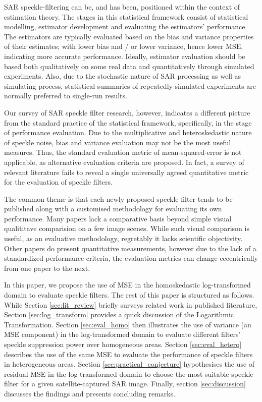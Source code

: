 \documentclass[journal]{IEEEtran}
\begin{document}
SAR speckle-filtering can be, and has been, positioned within the context of estimation theory\cite{Touzi_2002_TGRS}. 
The stages in this statistical framework consist of statistical modelling, estimator development and evaluating the estimators' performance. 
The estimators are typically evaluated based on the bias and variance properties of their estimates; 
	with lower bias and / or lower variance, hence lower MSE, indicating more accurate performance.
Ideally, estimator evaluation should be based both qualitatively on some real data and quantitatively through simulated experiments. 
Also, due to the stochastic nature of SAR processing as well as simulating process, 
	statistical summaries of repeatedly simulated experiments are normally preferred to single-run results.

Our survey of SAR speckle filter research, however, indicates 
	a different picture from the standard practice of the statistical framework, 
	specifically, in the stage of performance evaluation. 
Due to the multiplicative and heteroskedastic nature of speckle noise, 
	bias and variance evaluation may not be the most useful measures. 
Thus, the standard evaluation metric of mean-squared-error is not applicable,
	as alternative evaluation criteria are proposed.
In fact, a survey of relevant literature fails to reveal 
	a single universally agreed quantitative metric for the evaluation of speckle filters.

The common theme is that each newly proposed speckle filter tends to be published along with a customised methodology for evaluating its own performance.
Many papers lack a comparative basis beyond simple visual qualititave comparision on a few image scenes. 
While such visual comparison is useful, as an evaluative methodology, regretably it lacks scientific objectivity. 
Other papers do present quantitative measurements, 
	however  due to the lack of a standardized performance criteria, 
	the evaluation metrics can change eccentrically from one paper to the next.

In this paper, we propose the use of MSE in the homoskedastic log-transformed domain to evaluate speckle filters. 
The rest of this paper is structured as follows.
While Section \ref{sec:lit_review} briefly surveys related work in published literature, Section \ref{sec:log_transform} provides a quick discussion of the Logarithmic Transformation.
Section \ref{sec:eval_homo} then illustrates the use of variance (an MSE component) in the log-transformed domain to evaluate different filters' speckle suppression power over homogeneous areas.
Section \ref{sec:eval_hetero} describes the use of the same MSE to evaluate the performance of speckle filters in heterogeneous areas.
Section \ref{sec:practical_conjecture} hypothesises the use of residual MSE in the log-transformed domain 
	to choose the most suitable speckle filter for a given satellite-captured SAR image.
Finally, section \ref{sec:discussion} discusses the findings and presents concluding remarks.
\end{document}
